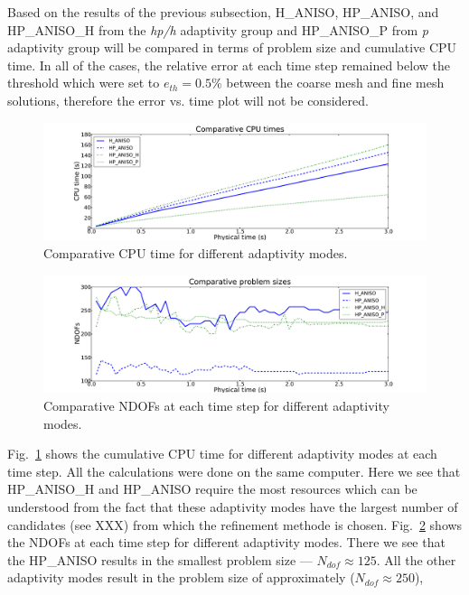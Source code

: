 Based on the results of the previous subsection, H\_ANISO, HP\_ANISO,
and HP\_ANISO\_H from the \emph{hp/h} adaptivity group and HP\_ANISO\_P
from \emph{p} adaptivity group will be compared
in terms of problem size and cumulative CPU time. 
In all of the cases, the relative 
error at each time step remained below
the threshold which were set to $e_{th}=0.5\%$ between the coarse mesh
and fine mesh solutions, therefore the error vs. time plot will not be considered.

\begin{figure}
  \begin{centering}
  \includegraphics[width=\columnwidth]{cpu}
  \caption{\label{fig:cpu} Comparative CPU time for different adaptivity modes.}
  \end{centering}
\end{figure}

\begin{figure}
  \begin{centering}
  \includegraphics[width=\columnwidth]{dof}
  \caption{\label{fig:dof} Comparative NDOFs at each time step for 
  different adaptivity modes.}
  \end{centering}
\end{figure}

Fig.~\ref{fig:cpu} shows the cumulative CPU time for different adaptivity
modes at each time step. All the calculations were done on the same computer.
Here we see that HP\_ANISO\_H and HP\_ANISO require the most
resources which can be understood from the fact that these 
adaptivity modes have the largest number of 
candidates (see XXX) from which the refinement methode is chosen.
Fig.~\ref{fig:dof} shows the NDOFs at each time step for different adaptivity modes.
There we see that the HP\_ANISO results in the 
smallest problem size --- $N_{dof} \approx 125$. 
All the other adaptivity modes result in the 
problem size of approximately ($N_{dof} \approx 250$), 

